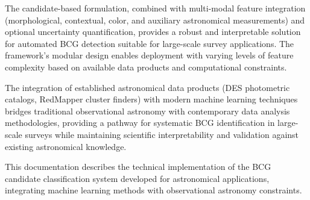 \documentclass[twocolumn,10pt]{aastex631}
\begin{document}
The candidate-based formulation, combined with multi-modal feature integration (morphological, contextual, color, and auxiliary astronomical measurements) and optional uncertainty quantification, provides a robust and interpretable solution for automated BCG detection suitable for large-scale survey applications. The framework's modular design enables deployment with varying levels of feature complexity based on available data products and computational constraints.

The integration of established astronomical data products (DES photometric catalogs, RedMapper cluster finders) with modern machine learning techniques bridges traditional observational astronomy with contemporary data analysis methodologies, providing a pathway for systematic BCG identification in large-scale surveys while maintaining scientific interpretability and validation against existing astronomical knowledge.

\acknowledgments
This documentation describes the technical implementation of the BCG candidate classification system developed for astronomical applications, integrating machine learning methods with observational astronomy constraints.
\end{document}
